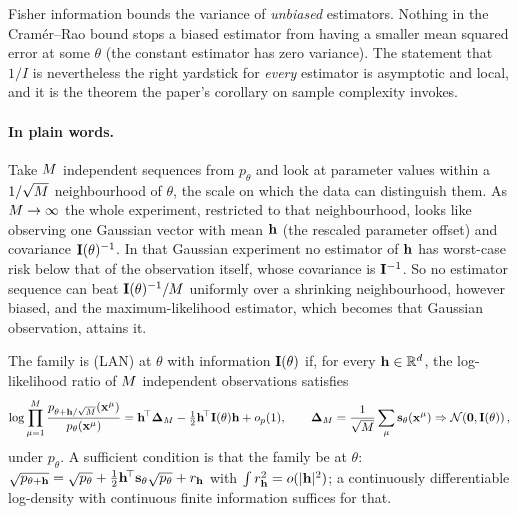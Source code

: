 Fisher information bounds the variance of \emph{unbiased} estimators. Nothing in the
Cram\'er--Rao bound stops a biased estimator from having a smaller mean squared error
at some $\theta$ (the constant estimator has zero variance). The statement that
$1/I$ is nevertheless the right yardstick for \emph{every} estimator is asymptotic and
local, and it is the theorem the paper's corollary on sample complexity invokes.

\paragraph{In plain words.}
Take $M$ independent sequences from $p_\theta$ and look at parameter values within
a $1/\sqrt{M}$ neighbourhood of $\theta$, the scale on which the data can
distinguish them. As $M\to\infty$ the whole experiment, restricted to that
neighbourhood, looks like observing one Gaussian vector with mean $\mathbf{h}$ (the
rescaled parameter offset) and covariance $\mathbf{I}(\theta)^{-1}$. In that Gaussian
experiment no estimator of $\mathbf{h}$ has worst-case risk below that of the observation
itself, whose covariance is $\mathbf{I}^{-1}$. So no estimator sequence can beat
$\mathbf{I}(\theta)^{-1}/M$ uniformly over a shrinking neighbourhood, however biased,
and the maximum-likelihood estimator, which becomes that Gaussian observation,
attains it.

\begin{definition}
The family is  (LAN) at $\theta$ with information
$\mathbf{I}(\theta)$ if, for every $\mathbf{h}\in\mathbb{R}^d$, the log-likelihood ratio of $M$
independent observations satisfies
\begin{equation}
  \log\prod_{\mu=1}^{M}\frac{p_{\theta+\mathbf{h}/\sqrt{M}}(\mathbf{x}^\mu)}{p_\theta(\mathbf{x}^\mu)}
  =\mathbf{h}^{\!\top}\mathbf{\Delta}_{M}-\tfrac12\mathbf{h}^{\!\top}\mathbf{I}(\theta)\mathbf{h}+o_{p}(1),
  \qquad \mathbf{\Delta}_{M}=\frac1{\sqrt{M}}\sum_\mu\mathbf{s}_\theta(\mathbf{x}^\mu)\Rightarrow\mathcal{N}\!\left(\mathbf{0},\mathbf{I}(\theta)\right),
\end{equation}
under $p_\theta$. A sufficient condition is that the family be
 at $\theta$: $\sqrt{p_{\theta+\mathbf{h}}}=\sqrt{p_\theta}+\tfrac12\mathbf{h}^{\!\top}\mathbf{s}_\theta\sqrt{p_\theta}+r_{\mathbf{h}}$
with $\int r_{\mathbf{h}}^2=o(|\mathbf{h}|^2)$; a continuously differentiable log-density with
continuous finite information suffices for that.
\end{definition}

